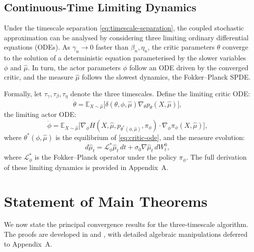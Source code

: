 \subsection{Continuous-Time Limiting Dynamics}

Under the timescale separation \eqref{eq:timescale-separation}, the coupled
stochastic approximation can be analysed by considering three limiting ordinary
differential equations (ODEs). As $\gamma_n \to 0$ faster than $\beta_n, \eta_n$, the
critic parameters $\theta$ converge to the solution of a deterministic equation
parameterised by the slower variables $\phi$ and $\hat\mu$. In turn, the actor
parameters $\phi$ follow an ODE driven by the converged critic, and the measure
$\hat\mu$ follows the slowest dynamics, the Fokker--Planck SPDE.

Formally, let $\tau_\gamma, \tau_\beta, \tau_\eta$ denote the three timescales. Define
the limiting critic ODE:
\begin{equation}
    \dot\theta = \mathbb{E}_{X \sim \hat\mu}\big[ \delta(\theta, \phi, \hat\mu)
    \nabla_\theta p_\theta(X, \hat\mu) \big],
    \label{eq:critic-ode}
\end{equation}
the limiting actor ODE:
\begin{equation}
    \dot\phi = \mathbb{E}_{X \sim \hat\mu}\big[ \nabla_\phi H(X, \hat\mu,
    p_{\theta^*(\phi,\hat\mu)}, \pi_\phi) \cdot \nabla_\phi \pi_\phi(X, \hat\mu) \big],
    \label{eq:actor-ode}
\end{equation}
where $\theta^*(\phi, \hat\mu)$ is the equilibrium of \eqref{eq:critic-ode}, and the
measure evolution:
\begin{equation}
    d\hat\mu_t = \mathcal{L}_\phi^* \hat\mu_t\, dt + \sigma_0 \nabla \hat\mu_t\,
    dW_t^0,
    \label{eq:measure-filter-spde}
\end{equation}
where $\mathcal{L}_\phi^*$ is the Fokker--Planck operator under the policy $\pi_\phi$.
The full derivation of these limiting dynamics is provided in Appendix~A.


\section{Statement of Main Theorems}
\label{sec:rl-theorems}

We now state the principal convergence results for the three-timescale algorithm. The
proofs are developed in  and ,
with detailed algebraic manipulations deferred to Appendix~A.

